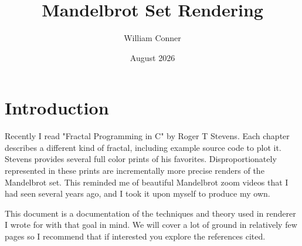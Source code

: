 \documentclass{article}
\title{Mandelbrot Set Rendering}
\author{William Conner}
\date{August 2026}
\begin{document}
\maketitle

\section{Introduction}
\par Recently I read "Fractal Programming in C" by Roger T Stevens\cite{Stevens_1989}. Each chapter describes a different kind of fractal, including example source code to plot it. Stevens provides several full color prints of his favorites. Disproportionately represented in these prints are incrementally more precise renders of the Mandelbrot set. This reminded me of beautiful Mandelbrot zoom videos that I had seen several years ago, and I took it upon myself to produce my own.
\par This document is a documentation of the techniques and theory used in renderer I wrote for with that goal in mind. We will cover a lot of ground in relatively few pages so I recommend that if interested you explore the references cited.
\end{document}
